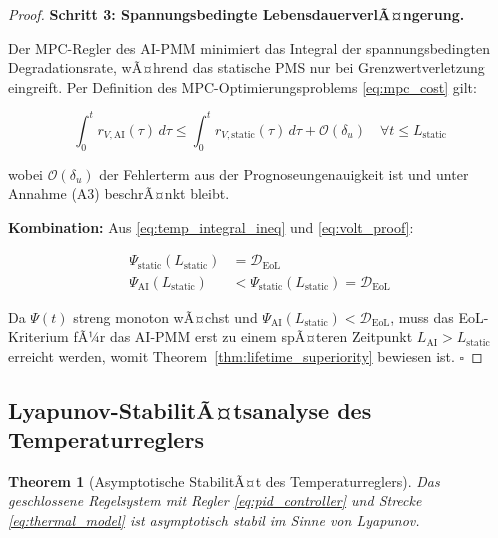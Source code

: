 ﻿\documentclass[12pt,a4paper]{article}
\newtheorem{theorem}{Theorem}[section]
\begin{document}
\begin{proof}
		\textbf{Schritt 3: Spannungsbedingte LebensdauerverlÃ¤ngerung.}
		
		Der MPC-Regler des AI-PMM minimiert das Integral der spannungsbedingten
		Degradationsrate, wÃ¤hrend das statische PMS nur bei Grenzwertverletzung
		eingreift. Per Definition des MPC-Optimierungsproblems \eqref{eq:mpc_cost}
		gilt:
		
		\begin{equation}
			\int_0^{t} r_{V,\mathrm{AI}}(\tau)\,d\tau \leq
			\int_0^{t} r_{V,\mathrm{static}}(\tau)\,d\tau + \mathcal{O}(\delta_u)
			\quad \forall t \leq L_\mathrm{static}
			\label{eq:volt_proof}
		\end{equation}
		
		wobei $\mathcal{O}(\delta_u)$ der Fehlerterm aus der Prognoseungenauigkeit ist
		und unter Annahme (A3) beschrÃ¤nkt bleibt.
		
		\textbf{Kombination:} Aus \eqref{eq:temp_integral_ineq} und \eqref{eq:volt_proof}:
		
		\begin{align}
			\Psi_\mathrm{static}(L_\mathrm{static}) &= \mathcal{D}_\mathrm{EoL} \\
			\Psi_\mathrm{AI}(L_\mathrm{static}) &< \Psi_\mathrm{static}(L_\mathrm{static})
			= \mathcal{D}_\mathrm{EoL}
		\end{align}
		
		Da $\Psi(t)$ streng monoton wÃ¤chst und $\Psi_\mathrm{AI}(L_\mathrm{static}) <
		\mathcal{D}_\mathrm{EoL}$, muss das EoL-Kriterium fÃ¼r das AI-PMM erst zu einem
		spÃ¤teren Zeitpunkt $L_\mathrm{AI} > L_\mathrm{static}$ erreicht werden, womit
		Theorem~\ref{thm:lifetime_superiority} bewiesen ist. \hfill$\square$
	\end{proof}
	
	\subsection{Lyapunov-StabilitÃ¤tsanalyse des Temperaturreglers}
	
	\begin{theorem}[Asymptotische StabilitÃ¤t des Temperaturreglers]
		\label{thm:lyapunov}
		Das geschlossene Regelsystem mit Regler \eqref{eq:pid_controller} und Strecke
		\eqref{eq:thermal_model} ist asymptotisch stabil im Sinne von Lyapunov.
	\end{theorem}
	
\end{document}
